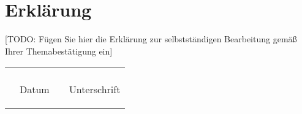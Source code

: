\chapter*{Erklärung}

[TODO: Fügen Sie hier die Erklärung zur selbstständigen Bearbeitung gemäß Ihrer Themabestätigung ein]

\vspace{2cm}
\begin{tabular}{@{}p{0cm}p{6cm}p{}p{6cm}@{}}
& \hrulefill & & \hrulefill\\
& \begin{flushleft}Datum\end{flushleft} & & \begin{flushleft}Unterschrift\end{flushleft}\\
\end{tabular}

